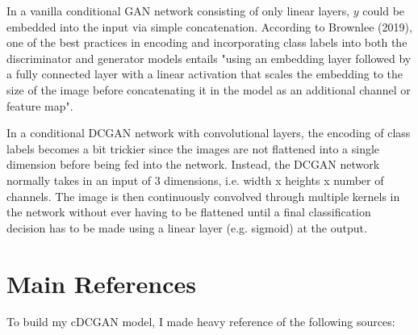 \documentclass[11pt]{article}
\begin{document}
In a vanilla conditional GAN network consisting of only linear layers, \(y\) could be
embedded into the input via simple concatenation. According to Brownlee
(2019), one of the best practices in encoding and incorporating class
labels into both the discriminator and generator models entails "using
an embedding layer followed by a fully connected layer with a linear
activation that scales the embedding to the size of the image before
concatenating it in the model as an additional channel or feature map".

In a conditional DCGAN network with convolutional layers, the encoding
of class labels becomes a bit trickier since the images are not
flattened into a single dimension before being fed into the network.
Instead, the DCGAN network normally takes in an input of 3 dimensions,
i.e. width x heights x number of channels. The image is then
continuously convolved through multiple kernels in the network without
ever having to be flattened until a final classification decision has to
be made using a linear layer (e.g. sigmoid) at the output.

\section{Main References}\label{main-references}

To build my cDCGAN model, I made heavy reference of the following
sources:
\end{document}

